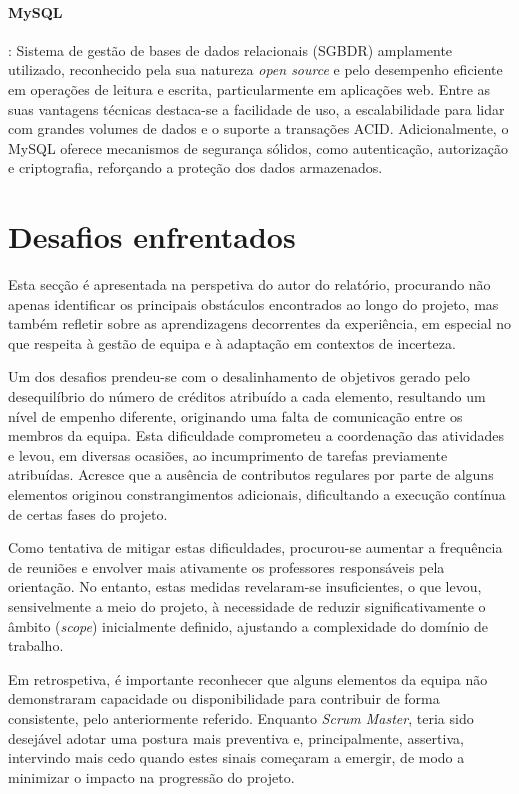 \paragraph{MySQL}: Sistema de gestão de bases de dados relacionais (SGBDR) amplamente utilizado, reconhecido pela sua natureza \textit{open source} e pelo desempenho eficiente em operações de leitura e escrita, particularmente em aplicações web. Entre as suas vantagens técnicas destaca-se a facilidade de uso, a escalabilidade para lidar com grandes volumes de dados e o suporte a transações ACID. Adicionalmente, o MySQL oferece mecanismos de segurança sólidos, como autenticação, autorização e criptografia, reforçando a proteção dos dados armazenados.




\section{Desafios enfrentados}

Esta secção é apresentada na perspetiva do autor do relatório, procurando não apenas identificar os principais obstáculos encontrados ao longo do projeto, mas também refletir sobre as aprendizagens decorrentes da experiência, em especial no que respeita à gestão de equipa e à adaptação em contextos de incerteza.

Um dos desafios prendeu-se com o desalinhamento de objetivos gerado pelo desequilíbrio do número de créditos atribuído a cada elemento, resultando um nível de empenho diferente, originando uma falta de comunicação entre os membros da equipa. Esta dificuldade comprometeu a coordenação das atividades e levou, em diversas ocasiões, ao incumprimento de tarefas previamente atribuídas. Acresce que a ausência de contributos regulares por parte de alguns elementos originou constrangimentos adicionais, dificultando a execução contínua de certas fases do projeto.

Como tentativa de mitigar estas dificuldades, procurou-se aumentar a frequência de reuniões e envolver mais ativamente os professores responsáveis pela orientação. No entanto, estas medidas revelaram-se insuficientes, o que levou, sensivelmente a meio do projeto, à necessidade de reduzir significativamente o âmbito (\textit{scope}) inicialmente definido, ajustando a complexidade do domínio de trabalho.

Em retrospetiva, é importante reconhecer que alguns elementos da equipa não demonstraram capacidade ou disponibilidade para contribuir de forma consistente, pelo anteriormente referido. Enquanto \textit{Scrum Master}, teria sido desejável adotar uma postura mais preventiva e, principalmente, assertiva, intervindo mais cedo quando estes sinais começaram a emergir, de modo a minimizar o impacto na progressão do projeto.